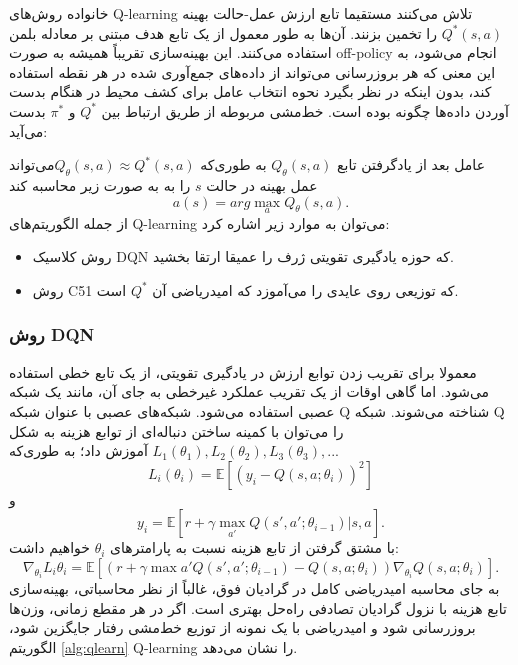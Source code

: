 خانواده روش‌های  Q-learning تلاش می‌کنند مستقیما تابع ارزش عمل-حالت بهینه $Q^*(s,a)$ را تخمین بزنند. آن‌ها به طور معمول از یک تابع هدف مبتنی بر معادله بلمن استفاده می‌کنند. این بهینه‌سازی تقریباً همیشه به صورت off-policy انجام می‌شود، به این معنی که هر بروزرسانی می‌تواند از داده‌های جمع‌آوری شده در هر نقطه استفاده کند، بدون اینکه در نظر بگیرد نحوه انتخاب عامل برای کشف محیط در هنگام بدست آوردن داده‌ها چگونه بوده است. خط‌مشی مربوطه از طریق ارتباط بین 
$Q^*$
و
$\pi^*$
 بدست می‌آید: 
 
 عامل بعد از یادگرفتن تابع $Q_\theta(s,a)$ به طوری‌که  $Q_\theta(s,a) \approx Q^*(s,a)$می‌تواند عمل بهینه در حالت $s$ را به به صورت زیر محاسبه کند $$a(s) = arg \max_a Q_{\theta}(s,a).$$
از جمله الگوریتم‌های Q-learning می‌توان به موارد زیر اشاره کرد:
\begin{itemize}
\item روش کلاسیک DQN که حوزه یادگیری تقویتی ژرف را عمیقا ارتقا بخشید.
\item روش C51 که توزیعی روی عایدی را می‌آموزد که امیدریاضی آن $Q^*$ است.
\end{itemize}
\subsubsection{روش DQN}
معمولا برای تقریب زدن توابع ارزش در یادگیری تقویتی، از یک تابع خطی استفاده می‌شود.
اما گاهی اوقات از یک تقریب عملکرد غیرخطی به جای آن، مانند یک شبکه عصبی استفاده می‌شود. شبکه‌های عصبی با عنوان شبکه Q شناخته می‌شوند.
شبکه Q را می‌توان با کمینه ساختن دنباله‌ای از توابع هزینه به شکل 
$L_1(\theta_1), L_2(\theta_2), L_3(\theta_3), ... $ آموزش داد؛ به طوری‌که
$$L_i(\theta_i)=\mathbb{E}\left[(y_i - Q(s,a;\theta_i))^2\right]$$  و  $$y_i = \mathbb{E}[r + \gamma \max_{a'} Q(s',a'; \theta_{i-1})| s,a].$$ با مشتق گرفتن از تابع هزینه نسبت به پارامترهای $\theta_i$  خواهیم داشت: $$\nabla_{\theta_i} L_i{\theta_i} = \mathbb{E}\left[ \left(r + \gamma \max{a'} Q(s',a';\theta_{i-1}) - Q(s,a;\theta_i)\right) \nabla_{\theta_i} Q(s,a;\theta_i)\right].$$
به جای محاسبه امیدریاضی کامل در گرادیان فوق، غالباً از نظر محاسباتی، بهینه‌سازی تابع هزینه با نزول گرادیان تصادفی   راه‌حل بهتری است. اگر در هر مقطع زمانی، وزن‌ها بروزرسانی شود و امیدریاضی با یک نمونه از توزیع خط‌مشی رفتار  جایگزین شود، الگوریتم
\ref{alg:qlearn}
 Q-learning را نشان می‌دهد.
 
